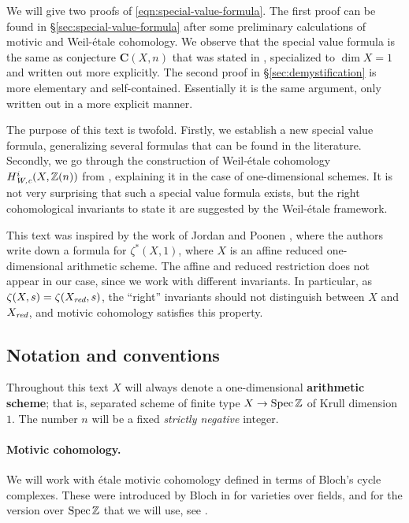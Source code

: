 \documentclass[draft]{article}
\numberwithin{equation}{section}
\begin{document}
\vspace{1em}

We will give two proofs of \eqref{eqn:special-value-formula}. The first proof
can be found in \S\ref{sec:special-value-formula} after some preliminary
calculations of motivic and Weil-\'{e}tale cohomology. We observe that the special
value formula is the same as conjecture $\mathbf{C} (X,n)$ that was stated in
\cite{Beshenov-Weil-etale-2}, specialized to $\dim X = 1$ and written out more
explicitly. The second proof in \S\ref{sec:demystification} is more elementary
and self-contained. Essentially it is the same argument, only written out in a
more explicit manner.

The purpose of this text is twofold. Firstly, we establish a new special value
formula, generalizing several formulas that can be found in the
literature. Secondly, we go through the construction of Weil-\'{e}tale cohomology
$H^i_{\text{\it W,c}} (X, \mathbb{Z}(n))$ from \cite{Beshenov-Weil-etale-1}, explaining it in the
case of one-dimensional schemes. It is not very surprising that such a special
value formula exists, but the right cohomological invariants to state it are
suggested by the Weil-\'{e}tale framework.

This text was inspired by the work of Jordan and Poonen
\cite{Jordan-Poonen-2020}, where the authors write down a formula for
$\zeta^* (X,1)$, where $X$ is an affine reduced one-dimensional arithmetic
scheme. The affine and reduced restriction does not appear in our case, since we
work with different invariants. In particular, as
$\zeta (X,s) = \zeta (X_{\text{\it red}}, s)$, the ``right'' invariants should not
distinguish between $X$ and $X_{\text{\it red}}$, and motivic cohomology satisfies this
property.

\subsection*{Notation and conventions}

Throughout this text $X$ will always denote a one-dimensional
\textbf{arithmetic scheme}; that is, separated scheme of finite type
$X \to \operatorname{Spec} \mathbb{Z}$ of Krull dimension $1$. The number $n$ will be a fixed
\emph{strictly negative} integer.

\paragraph{Motivic cohomology.}
We will work with \'{e}tale motivic cohomology defined in terms of Bloch's cycle
complexes. These were introduced by Bloch in \cite{Bloch-1986} for varieties
over fields, and for the version over $\operatorname{Spec} \mathbb{Z}$ that we will use, see
\cite{Geisser-2004-Dedekind,Geisser-2005}.
\end{document}
